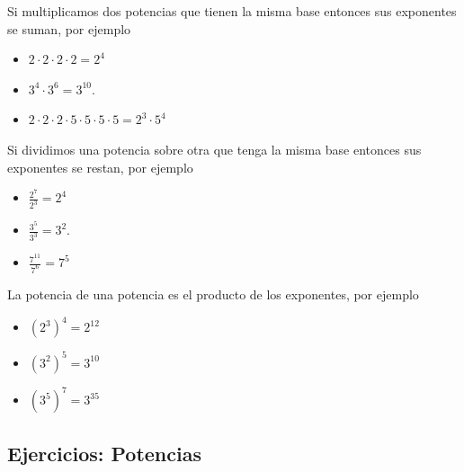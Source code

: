 \begin{tcolorbox}[colback=red!5!white,colframe=red!75!black]
	Si multiplicamos dos potencias que tienen la misma base entonces sus exponentes se suman, por ejemplo
	\begin{itemize}
		\item $2\cdot 2\cdot 2\cdot 2 = 2^4$
		\item $3^4\cdot 3^6 = 3^{10}$.
		\item $2\cdot 2\cdot 2\cdot 5\cdot 5\cdot 5\cdot5 =2^3\cdot5^4$
	\end{itemize}
\end{tcolorbox}

\begin{tcolorbox}[colback=red!5!white,colframe=red!75!black]
	Si dividimos una potencia sobre otra que tenga la misma base entonces sus exponentes se restan, por ejemplo
	\begin{itemize}
		\item $\frac{2^7}{2^3} = 2^4$
		\item $\frac{3^5}{3^3}= 3^2$.
		\item $\frac{7^{11}}{7^6} =7^5$
	\end{itemize}
\end{tcolorbox}

\begin{tcolorbox}[colback=red!5!white,colframe=red!75!black]
	La potencia de una potencia es el producto de los exponentes, por ejemplo 
	\begin{itemize}	
		\item ${(2^3)}^4=2^{12}$
		\item ${(3^2)}^5=3^{10}$
		\item ${(3^5)}^7=3^{35}$
	\end{itemize}
\end{tcolorbox}

\newpage

\begin{center}
	\vspace{-1cm}
	\subsection{ Ejercicios: Potencias}\label{ejercicios:potencias}
\end{center}

